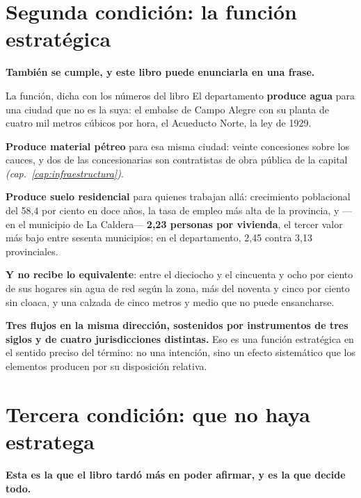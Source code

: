 \section{Segunda condición: la función estratégica}

\textbf{También se cumple, y este libro puede enunciarla en una frase.}

\begin{ficha}{La función, dicha con los números del libro}
El departamento \textbf{produce agua} para una ciudad que no es la suya: el embalse de Campo
Alegre con su planta de cuatro mil metros cúbicos por hora, el Acueducto Norte, la ley de 1929.

\textbf{Produce material pétreo} para esa misma ciudad: veinte concesiones sobre los cauces, y
dos de las concesionarias son contratistas de obra pública de la capital \textit{(cap.\
\ref{cap:infraestructura})}.

\textbf{Produce suelo residencial} para quienes trabajan allá: crecimiento poblacional del
58,4 por ciento en doce años, la tasa de empleo más alta de la provincia, y ---en el municipio de La Caldera--- \textbf{2,23
personas por vivienda}, el tercer valor más bajo entre sesenta municipios; en el departamento, 2,45 contra 3,13 provinciales.

\textbf{Y no recibe lo equivalente}: entre el dieciocho y el cincuenta y ocho por ciento de sus
hogares sin agua de red según la zona, más del noventa y cinco por ciento sin cloaca, y una
calzada de cinco metros y medio que no puede ensancharse.
\end{ficha}

\textbf{Tres flujos en la misma dirección, sostenidos por instrumentos de tres siglos y de
cuatro jurisdicciones distintas.} Eso es una función estratégica en el sentido preciso del
término: no una intención, sino un efecto sistemático que los elementos producen por su
disposición relativa.

\section{Tercera condición: que no haya estratega}

\textbf{Esta es la que el libro tardó más en poder afirmar, y es la que decide todo.}

